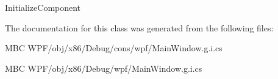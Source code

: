 Initialize\-Component 



The documentation for this class was generated from the following files\-:\begin{DoxyCompactItemize}
\item 
M\-B\-C W\-P\-F/obj/x86/\-Debug/cons/wpf/Main\-Window.\-g.\-i.\-cs\item 
M\-B\-C W\-P\-F/obj/x86/\-Debug/wpf/Main\-Window.\-g.\-i.\-cs\end{DoxyCompactItemize}
